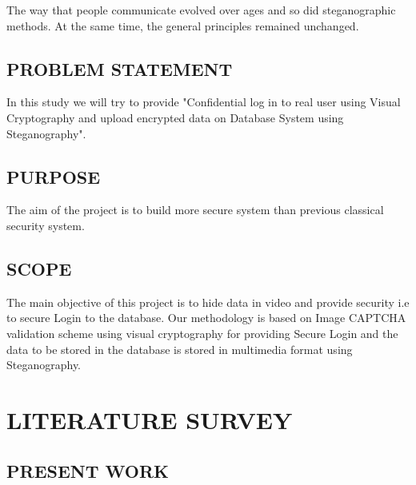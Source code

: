 \documentclass[12pt]{extreport}
\begin{document}
The way that people communicate evolved over ages and so did steganographic methods. At the same time, the general principles remained unchanged. 

\section{PROBLEM STATEMENT}
\hspace*{5em}In this study we will try to provide "Confidential log in to real user using Visual Cryptography and upload encrypted data on Database System using Steganography".


\section{PURPOSE}
\hspace*{5em}The aim of the project is to build more secure system than previous classical security system.



\section{SCOPE}
\hspace*{5em}The main objective of this project is to hide data  in video and provide security i.e to secure Login to the database. Our methodology is based on Image CAPTCHA validation scheme using visual cryptography for providing Secure Login and the data to be stored in the database is stored in multimedia format using Steganography.
	







\chapter{LITERATURE SURVEY}

\section{PRESENT WORK} 
\end{document}
